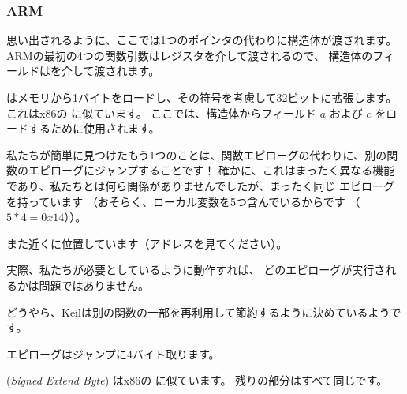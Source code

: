 ﻿\subsubsection{ARM}

\myparagraph{\OptimizingKeilVI (\ThumbMode)}



思い出されるように、ここでは1つのポインタの代わりに構造体が渡されます。
ARMの最初の4つの関数引数はレジスタを介して渡されるので、
構造体のフィールドはを介して渡されます。

はメモリから1バイトをロードし、その符号を考慮して32ビットに拡張します。 
これはx86の \MOVSX に似ています。 
ここでは、構造体からフィールド $a$ および $c$ をロードするために使用されます。


私たちが簡単に見つけたもう1つのことは、関数エピローグの代わりに、別の関数のエピローグにジャンプすることです！ 
確かに、これはまったく異なる機能であり、私たちとは何ら関係がありませんでしたが、まったく同じ
エピローグを持っています
（おそらく、ローカル変数を5つ含んでいるからです
（$5*4=0x14$））。

また近くに位置しています（アドレスを見てください）。

実際、私たちが必要としているように動作すれば、
どのエピローグが実行されるかは問題ではありません。

どうやら、Keilは別の関数の一部を再利用して節約するように決めているようです。

エピローグはジャンプに4バイト取ります。




 (\emph{Signed Extend Byte}) はx86の \MOVSX に似ています。
残りの部分はすべて同じです。
